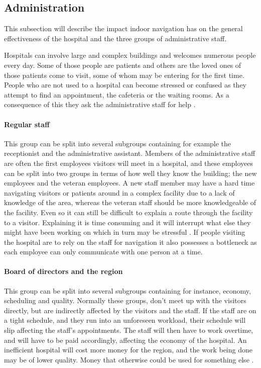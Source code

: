 \subsection{Administration}

This subsection will describe the impact indoor navigation has on the general effectiveness of the hospital and the three groups of administrative staff.

Hospitals can involve large and complex buildings \cite{wifi_navigation_ca} and welcomes numerous people every day. Some of those people are patients and others are the loved ones of those patients come to visit, some of whom may be entering for the first time. People who are not used to a hospital can become stressed or confused as they attempt to find an appointment, the cafeteria or the waiting rooms. As a consequence of this they ask the administrative staff for help \cite{Frivillige_guider}.

\paragraph{Regular staff}
This group can be split into several subgroups containing for example the receptionist and the administrative assistant. Members of the administrative staff are often the first employees visitors will meet in a hospital, and these employees can be split into two groups in terms of how well they know the building; the new employees and the veteran employees. A new staff member may have a hard time navigating visitors or patients around in a complex facility due to a lack of knowledge of the area, whereas the veteran staff should be more knowledgeable of the facility. Even so it can still be difficult to explain a route through the facility to a visitor. Explaining it is time consuming and it will interrupt what else they might have been working on which in turn may be stressful \cite{arbejdsmiljo_ca}. If people visiting the hospital are to rely on the staff for navigation it also possesses a bottleneck as each employee can only communicate with one person at a time.

\paragraph{Board of directors and the region}
This group can be split into several subgroups containing for instance, economy, scheduling and quality. Normally these groups, don't meet up with the visitors directly, but are indirectly affected by the visitors and the staff. If the staff are on a tight schedule, and they run into an unforeseen workload, their schedule will slip affecting the staff's appointments. The staff will then have to work overtime, and  will have to be paid accordingly, affecting the economy of the hospital. An inefficient hospital will cost more money for the region, and the work being done may be of lower quality. Money that otherwise could be used for something else \cite{timer_til_at_hjelpe_rundt}.

